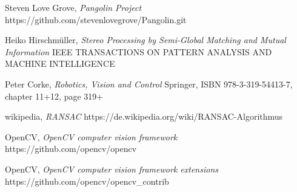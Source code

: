 \documentclass[11pt,a4paper,titlepage,oneside]{report}
\begin{document}
\begin{thebibliography}{1}
	Steven Love Grove,
	\textit{Pangolin Project}
	https://github.com/stevenlovegrove/Pangolin.git

	Heiko Hirschmüller,
	\textit{ Stereo Processing by Semi-Global Matching and Mutual Information}
	IEEE TRANSACTIONS ON PATTERN ANALYSIS AND MACHINE INTELLIGENCE
	 
	Peter Corke,
	\textit{Robotics, Vision and Control}
	Springer, ISBN 978-3-319-54413-7, chapter 11+12, page 319+

	wikipedia,
	\textit{RANSAC}
	https://de.wikipedia.org/wiki/RANSAC-Algorithmus

	OpenCV,
	\textit{OpenCV computer vision framework}
	https://github.com/opencv/opencv

	OpenCV,
	\textit{OpenCV computer vision framework extensions}
	https://github.com/opencv/opencv\_contrib

\end{thebibliography}
\end{document}
